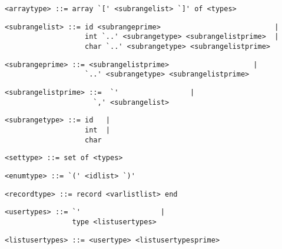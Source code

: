 \begin{footnotesize}
\begin{lstlisting}[frame=single, label={arraytype}, language=pie]
<arraytype> ::= array `[' <subrangelist> `]' of <types>
\end{lstlisting}

\begin{lstlisting}[frame=single, label={subrangelist}, language=pie]
<subrangelist> ::= id <subrangeprime>                           |
                   int `..' <subrangetype> <subrangelistprime>  |
                   char `..' <subrangetype> <subrangelistprime>
\end{lstlisting}

\begin{lstlisting}[frame=single, label={subrangeprime}, language=pie]
<subrangeprime> ::= <subrangelistprime>                    |
                   `..' <subrangetype> <subrangelistprime>
\end{lstlisting}


\begin{lstlisting}[frame=single, label={subrangelistprime}, language=pie]
<subrangelistprime> ::=  `'                 |
	                 `,' <subrangelist>
\end{lstlisting}
\begin{lstlisting}[frame=single, label={subrangetype}, language=pie]
<subrangetype> ::= id   |
                   int  |
                   char
\end{lstlisting}

\begin{lstlisting}[frame=single, label={settype}, language=pie]
<settype> ::= set of <types>
\end{lstlisting}

\begin{lstlisting}[frame=single, label={enumtype}, language=pie]
<enumtype> ::= `(' <idlist> `)'
\end{lstlisting}

\begin{lstlisting}[frame=single, label={recordtype}, language=pie]
<recordtype> ::= record <varlistlist> end
\end{lstlisting}

\begin{lstlisting}[frame=single, label={usertypes}]
<usertypes> ::= `'                   |
                type <listusertypes>
\end{lstlisting}

\begin{lstlisting}[frame=single, label={listusertypes}]
<listusertypes> ::= <usertype> <listusertypesprime>
\end{lstlisting}


\end{footnotesize}
